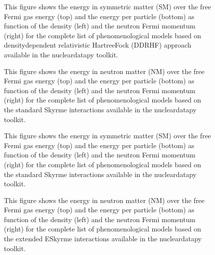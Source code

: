 \documentclass[letterpaper,10pt,english]{sphinxmanual}
\begin{document}
\begin{figure}[htbp]
\centering
\capstart

\noindent{}
\caption{This figure shows the energy in symmetric matter (SM) over the free Fermi gas energy (top) and the energy per particle (bottom) as function of the density (left) and the neutron Fermi momentum (right) for the complete list of phenomenological models based on density\sphinxhyphen{}dependent relativistic Hartree\sphinxhyphen{}Fock (DDRHF) approach available in the nucleardatapy toolkit.}\label{\detokenize{source/api/setup_eos_pheno:id6}}\end{figure}

\begin{figure}[htbp]
\centering
\capstart

\noindent{}
\caption{This figure shows the energy in neutron matter (NM) over the free Fermi gas energy (top) and the energy per particle (bottom) as function of the density (left) and the neutron Fermi momentum (right) for the complete list of phenomenological models based on the standard Skyrme interactions available in the nucleardatapy toolkit.}\label{\detokenize{source/api/setup_eos_pheno:id7}}\end{figure}

\begin{figure}[htbp]
\centering
\capstart

\noindent{}
\caption{This figure shows the energy in symmetric matter (SM) over the free Fermi gas energy (top) and the energy per particle (bottom) as function of the density (left) and the neutron Fermi momentum (right) for the complete list of phenomenological models based on the standard Skyrme interactions available in the nucleardatapy toolkit.}\label{\detokenize{source/api/setup_eos_pheno:id8}}\end{figure}

\begin{figure}[htbp]
\centering
\capstart

\noindent{}
\caption{This figure shows the energy in neutron matter (NM) over the free Fermi gas energy (top) and the energy per particle (bottom) as function of the density (left) and the neutron Fermi momentum (right) for the complete list of phenomenological models based on the extended ESkyrme interactions available in the nucleardatapy toolkit.}\label{\detokenize{source/api/setup_eos_pheno:id9}}\end{figure}
\end{document}
